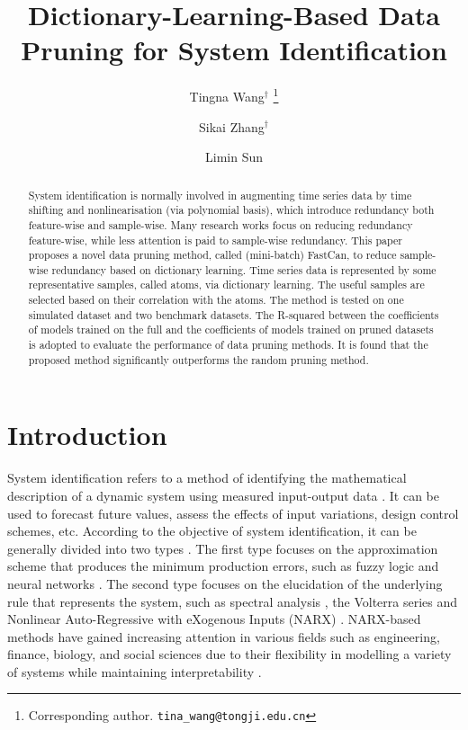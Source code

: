 \documentclass{article}
\title{Dictionary-Learning-Based Data Pruning for System Identification}
\author[1,3]{Tingna Wang$^\dagger$ \thanks{Corresponding author. \texttt{tina\_wang@tongji.edu.cn}}}
\author[2]{Sikai Zhang$^\dagger$}
\author[1,3,4]{Limin Sun}
\affil[1]{Department of Bridge Engineering, Tongji University, Shanghai, China}
\affil[2]{Baosight Software}
\affil[3]{Shanghai Qi Zhi Institute, Shanghai, China}
\affil[4]{State Key Laboratory of Disaster Reduction in Civil Engineering, Tongji University, Shanghai, China}
\begin{document}
\maketitle
\def\thefootnote{$\dagger$}\def\thefootnote{\arabic{footnote}}

\begin{abstract}
System identification is normally involved in augmenting time series data by time shifting and nonlinearisation (via polynomial basis), which introduce redundancy both feature-wise and sample-wise.
Many research works focus on reducing redundancy feature-wise, while less attention is paid to sample-wise redundancy.
This paper proposes a novel data pruning method, called (mini-batch) FastCan, to reduce sample-wise redundancy based on dictionary learning.
Time series data is represented by some representative samples, called atoms, via dictionary learning.
The useful samples are selected based on their correlation with the atoms.
The method is tested on one simulated dataset and two benchmark datasets.
The R-squared between the coefficients of models trained on the full and the coefficients of models trained on pruned datasets is adopted to evaluate the performance of data pruning methods.
It is found that the proposed method significantly outperforms the random pruning method.
\end{abstract}


\section{Introduction}
System identification refers to a method of identifying the mathematical description of a dynamic system using measured input-output data \cite{box2015time}. 
It can be used to forecast future values, assess the effects of input variations, design control schemes, etc. 
According to the objective of system identification,  it can be generally divided into two types \cite{billings2013nonlinear}. 
The first type focuses on the approximation scheme that produces the minimum production errors, such as fuzzy logic \cite{nelles785nonlinear} and neural networks \cite{miller1995neural}.
The second type focuses on the elucidation of the underlying rule that represents the system, such as spectral analysis \cite{jenkins1968spectral}, the Volterra series \cite{schetzen1980volterra} and Nonlinear Auto-Regressive with eXogenous Inputs (NARX) \cite{chen1989representations}. 
NARX-based methods have gained increasing attention in various fields such as engineering, finance, biology, and social sciences due to their flexibility in modelling a variety of systems while maintaining interpretability \cite{kukreja2003narmax, billings2013nonlinear, boynton2018applications}.
\end{document}
